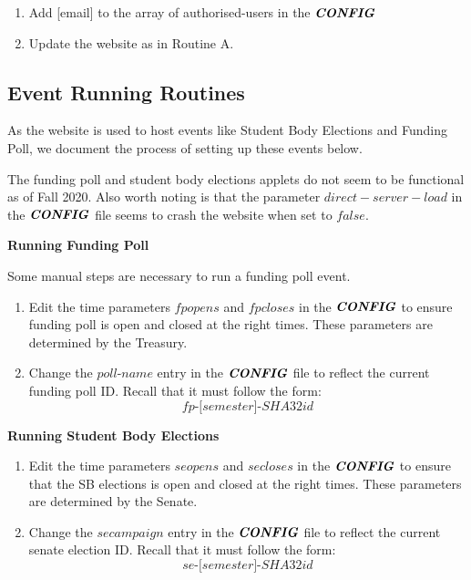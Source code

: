 \documentclass[a4paper]{article}
\begin{document}
\begin{enumerate}
  \item Add [email] to the array of authorised-users in the $\textbf{\textit{CONFIG}}$
  \item Update the website as in Routine A.
\end{enumerate}

\subsection{Event Running Routines}

As the website is used to host events like Student Body Elections and Funding Poll, we document the process of setting up these events below.

\begin{warning*}
The funding poll and student body elections applets do not seem to be functional as of Fall 2020. Also worth noting is that the parameter $direct-server-load$ in the $\textbf{\textit{CONFIG}}$ file seems to crash the website when set to $false$.
\end{warning*}

\begin{center}
\textbf{Running Funding Poll}
\end{center}

Some manual steps are necessary to run a funding poll event.

\begin{enumerate}
  \item Edit the time parameters $\textit{fpopens}$ and $\textit{fpcloses}$ in the $\textbf{\textit{CONFIG}}$ to ensure funding poll is open and closed at the right times. These parameters are determined by the Treasury.

  \item Change the $\textit{poll-name}$ entry in the $\textbf{\textit{CONFIG}}$ file to reflect the current funding poll ID. Recall that it must follow the form:
  $$\textit{fp-[semester]-SHA32id}$$
\end{enumerate}


\begin{center}
\textbf{Running Student Body Elections}
\end{center}

\begin{enumerate}
  \item Edit the time parameters $\textit{seopens}$ and $\textit{secloses}$ in the $\textbf{\textit{CONFIG}}$ to ensure that the SB elections is open and closed at the right times. These parameters are determined by the Senate.

  \item Change the $\textit{secampaign}$ entry in the $\textbf{\textit{CONFIG}}$ file to reflect the current senate election ID. Recall that it must follow the form:
  $$\textit{se-[semester]-SHA32id}$$
\end{enumerate}
\end{document}
